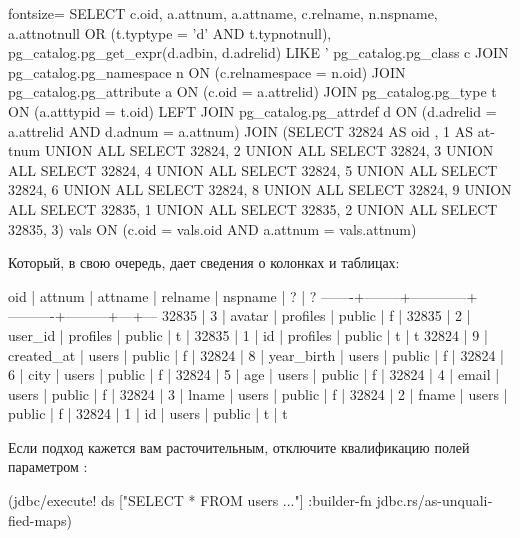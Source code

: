 \begin{english}
  \begin{sql*}{fontsize=\small}
SELECT c.oid, a.attnum, a.attname, c.relname, n.nspname,
a.attnotnull OR (t.typtype = 'd' AND t.typnotnull),
pg_catalog.pg_get_expr(d.adbin, d.adrelid) LIKE '%
pg_catalog.pg_class c JOIN pg_catalog.pg_namespace n
ON (c.relnamespace = n.oid) JOIN pg_catalog.pg_attribute a
ON (c.oid = a.attrelid) JOIN pg_catalog.pg_type t ON (a.atttypid
= t.oid) LEFT JOIN pg_catalog.pg_attrdef d ON (d.adrelid =
a.attrelid AND d.adnum = a.attnum) JOIN (SELECT 32824 AS oid , 1
AS attnum UNION ALL SELECT 32824, 2 UNION ALL SELECT 32824, 3
UNION ALL SELECT 32824, 4 UNION ALL SELECT 32824, 5 UNION ALL
SELECT 32824, 6 UNION ALL SELECT 32824, 8 UNION ALL SELECT 32824,
9 UNION ALL SELECT 32835, 1 UNION ALL SELECT 32835, 2 UNION ALL
SELECT 32835, 3) vals ON (c.oid = vals.oid AND a.attnum =
vals.attnum)
  \end{sql*}
\end{english}

Который, в свою очередь, дает сведения о колонках и таблицах:

\begin{english}
  \begin{text}
  oid  | attnum |  attname   | relname  | nspname | ? | ?
-------+--------+------------+----------+---------+---+---
 32835 |      3 | avatar     | profiles | public  | f |
 32835 |      2 | user_id    | profiles | public  | t |
 32835 |      1 | id         | profiles | public  | t | t
 32824 |      9 | created_at | users    | public  | f |
 32824 |      8 | year_birth | users    | public  | f |
 32824 |      6 | city       | users    | public  | f |
 32824 |      5 | age        | users    | public  | f |
 32824 |      4 | email      | users    | public  | f |
 32824 |      3 | lname      | users    | public  | f |
 32824 |      2 | fname      | users    | public  | f |
 32824 |      1 | id         | users    | public  | t | t
  \end{text}
\end{english}

Если подход кажется вам расточительным, отключите квалификацию полей параметром :

\begin{english}
  \begin{clojure}
(jdbc/execute!
 ds
 ["SELECT * FROM users ..."]
 {:builder-fn jdbc.rs/as-unqualified-maps})
  \end{clojure}
\end{english}

